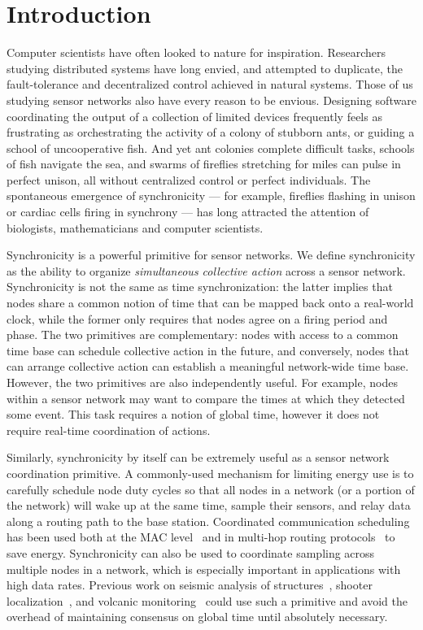 \section{Introduction}

Computer scientists have often looked to nature for inspiration.
Researchers studying distributed systems have long envied, and
attempted to duplicate, the fault-tolerance and decentralized control
achieved in natural systems.  Those of us studying sensor networks
also have every reason to be envious.  Designing software coordinating
the output of a collection of limited devices frequently feels as
frustrating as orchestrating the activity of a colony of stubborn
ants, or guiding a school of uncooperative fish.  And yet ant colonies
complete difficult tasks, schools of fish navigate the sea, and swarms
of fireflies stretching for miles can pulse in perfect unison, all
without centralized control or perfect individuals. The spontaneous
emergence of synchronicity --- for example, fireflies flashing in
unison or cardiac cells firing in synchrony --- has long attracted the
attention of biologists, mathematicians and computer scientists.


Synchronicity is a powerful primitive for sensor networks. We define
synchronicity as the ability to organize {\em simultaneous collective
action} across a sensor network. Synchronicity is not the same as time
synchronization: the latter implies that nodes share a common notion
of time that can be mapped back onto a real-world clock, while the
former only requires that nodes agree on a firing period and phase.
The two primitives are complementary: nodes with access to a common
time base can schedule collective action in the future, and
conversely, nodes that can arrange collective action can establish a
meaningful network-wide time base. However, the two primitives are also
independently useful. For example, nodes within a sensor network may
want to compare the times at which they detected some event. This task
requires a notion of global time, however it does not require
real-time coordination of actions. 

Similarly, synchronicity by itself can be extremely useful as a sensor
network coordination primitive. A commonly-used mechanism for limiting
energy use is to carefully schedule node duty cycles so that all nodes
in a network (or a portion of the network) will wake up at the same
time, sample their sensors, and relay data along a routing path to the
base station. Coordinated communication scheduling has been used both
at the MAC level~\cite{s-mac} and in multi-hop routing
protocols~\cite{stem} to save energy. Synchronicity can also be
used to coordinate sampling across multiple nodes in a network,
which is especially important in applications with high data
rates. Previous work on seismic analysis of
structures~\cite{glaser-smart-buildings}, shooter
localization~\cite{shooter-localization}, and volcanic
monitoring~\cite{volcano-ewsn05} could use such a primitive and avoid
the overhead of maintaining consensus on global time until
absolutely necessary.

